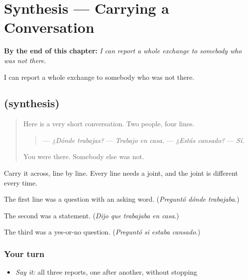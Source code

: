 
\chapter{Synthesis --- Carrying a Conversation}
\label{ch:sintesis-reportar}

\begin{chapteropening}
\textbf{By the end of this chapter:} \emph{I can report a whole exchange to somebody who was not there.}

I can report a whole exchange to somebody who was not there.
\end{chapteropening}

\section[(synthesis)]{(synthesis)}

\label{lesson:ES-C57-sintesis-reportar}



\begin{quote}
Here is a very short conversation. Two people, four lines.

\begin{quote}
— \emph{¿Dónde trabajas?} — \emph{Trabajo en casa.} — \emph{¿Estás cansado?} — \emph{Sí.}
\end{quote}

You were there. Somebody else was not.
\end{quote}

\begin{grammarlens}[title={What you've built}]
Carry it across, line by line. Every line needs a joint, and the joint is different every time.

The first line was a question with an asking word. (\emph{Preguntó dónde trabajaba}.)

The second was a statement. (\emph{Dijo que trabajaba en casa}.)

The third was a yes-or-no question. (\emph{Preguntó si estaba cansado}.)
\end{grammarlens}

\subsection*{Your turn}
\begin{itemize}
\raggedright
  \item \emph{Say it:} all three reports, one after another, without stopping
\end{itemize}

